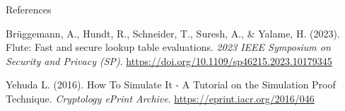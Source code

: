 \documentclass[../240906_cryptlab_flute.tex]{subfiles}
\begin{document}
\begin{frame}{References}
    \small
    \begin{itemize}
        \ii
        Brüggemann, A., Hundt, R., Schneider, T., Suresh, A., \& Yalame, H. (2023). Flute: Fast and
        secure lookup table evaluations. \textit{2023 IEEE Symposium on Security and Privacy (SP)}.
        \url{https://doi.org/10.1109/sp46215.2023.10179345}

        \ii
        Yehuda L. (2016). How To Simulate It - A Tutorial on the Simulation Proof Technique.
        \textit{Cryptology {ePrint} Archive}.
        \url{https://eprint.iacr.org/2016/046}
    \end{itemize}
\end{frame}
\end{document}
